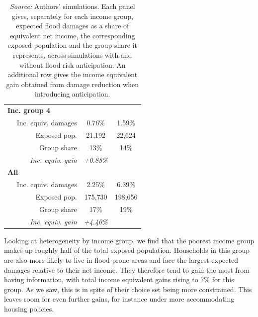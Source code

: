 \documentclass[12pt]{article}
\newcommand\fnote[1]{\captionsetup{justification=raggedright,singlelinecheck=false}\caption*{#1}}
\begin{document}
\begin{table}[htbp!]
\begin{tabular}{lll}
\cline{1-3}
\multicolumn{1}{l}{\textbf{Inc. group 4}} &
\multicolumn{1}{c}{} &
\multicolumn{1}{c}{}\\
\multicolumn{1}{r}{$\quad$ Inc. equiv. damages} &
\multicolumn{1}{c}{0.76\%} &
\multicolumn{1}{c}{1.59\%}\\
\multicolumn{1}{r}{$\quad$ Exposed pop.} &
\multicolumn{1}{c}{21,192} &
\multicolumn{1}{c}{22,624}\\
\multicolumn{1}{r}{$\quad$ Group share} &
\multicolumn{1}{c}{13\%} &
\multicolumn{1}{c}{14\%}\\
\multicolumn{1}{r}{$\quad$ \textit{Inc. equiv. gain}} &
\multicolumn{1}{c}{\textit{+0.88\%}} &
\multicolumn{1}{c}{\cellcolor{gray!25}}\\
\cline{1-3}
\multicolumn{1}{l}{\textbf{All}} &
\multicolumn{1}{c}{} &
\multicolumn{1}{c}{}\\
\multicolumn{1}{r}{$\quad$ Inc. equiv. damages} &
\multicolumn{1}{c}{2.25\%} &
\multicolumn{1}{c}{6.39\%}\\
\multicolumn{1}{r}{$\quad$ Exposed pop.} &
\multicolumn{1}{c}{175,730} &
\multicolumn{1}{c}{198,656}\\
\multicolumn{1}{r}{$\quad$ Group share} &
\multicolumn{1}{c}{17\%} &
\multicolumn{1}{c}{19\%}\\
\multicolumn{1}{r}{$\quad$ \textit{Inc. equiv. gain}} &
\multicolumn{1}{c}{\textit{+4.40\%}} &
\multicolumn{1}{c}{\cellcolor{gray!25}}\\
\cline{1-3}
\end{tabular}
\fnote{\scriptsize{\textit{Source:} Authors' simulations. Each panel gives, separately for each income group, expected flood damages as a share of equivalent net income, the corresponding exposed population and the group share it represents, across simulations with and without flood risk anticipation. An additional row gives the income equivalent gain obtained from damage reduction when introducing anticipation.}}
\end{table}

Looking at heterogeneity by income group, we find that the poorest income group makes up roughly half of the total exposed population. Households in this group are also more likely to live in flood-prone areas and face the largest expected damages relative to their net income. They therefore tend to gain the most from having information, with total income equivalent gains rising to 7\% for this group. As we saw, this is in spite of their choice set being more constrained. This leaves room for even further gains, for instance under more accommodating housing policies.
\end{document}
